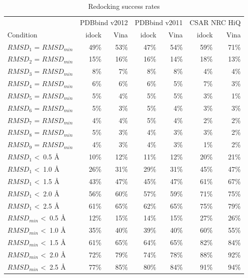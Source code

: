 \begin{table}
\caption{Redocking success rates}
\begin{tabular}{lrrrrrr}
\hline
& \multicolumn{2}{c}{PDBbind v2012} & \multicolumn{2}{c}{PDBbind v2011} & \multicolumn{2}{c}{CSAR NRC HiQ}\\
Condition & idock & Vina & idock & Vina & idock & Vina\\
\hline
$RMSD_1$ = $RMSD_{min}$ & 49\% & 53\% & 47\% & 54\% & 59\% & 71\%\\
$RMSD_2$ = $RMSD_{min}$ & 15\% & 16\% & 16\% & 14\% & 18\% & 13\%\\
$RMSD_3$ = $RMSD_{min}$ &  8\% &  7\% &  8\% &  8\% &  4\% &  4\%\\
$RMSD_4$ = $RMSD_{min}$ &  6\% &  6\% &  6\% &  5\% &  7\% &  3\%\\
$RMSD_5$ = $RMSD_{min}$ &  5\% &  4\% &  5\% &  5\% &  3\% &  1\%\\
$RMSD_6$ = $RMSD_{min}$ &  5\% &  3\% &  5\% &  4\% &  3\% &  3\%\\
$RMSD_7$ = $RMSD_{min}$ &  4\% &  4\% &  5\% &  4\% &  2\% &  2\%\\
$RMSD_8$ = $RMSD_{min}$ &  5\% &  3\% &  4\% &  3\% &  3\% &  2\%\\
$RMSD_9$ = $RMSD_{min}$ &  4\% &  3\% &  4\% &  3\% &  1\% &  2\%\\
\noalign{\smallskip}
$RMSD_1$ \textless\ 0.5 \AA & 10\% & 12\% & 11\% & 12\% & 20\% & 21\%\\
$RMSD_1$ \textless\ 1.0 \AA & 26\% & 31\% & 29\% & 31\% & 45\% & 47\%\\
$RMSD_1$ \textless\ 1.5 \AA & 43\% & 47\% & 45\% & 47\% & 61\% & 67\%\\
$RMSD_1$ \textless\ 2.0 \AA & 56\% & 60\% & 57\% & 59\% & 71\% & 75\%\\
$RMSD_1$ \textless\ 2.5 \AA & 61\% & 65\% & 62\% & 65\% & 75\% & 79\%\\
\noalign{\smallskip}
$RMSD_{min}$ \textless\ 0.5 \AA & 12\% & 15\% & 14\% & 15\% & 27\% & 26\%\\
$RMSD_{min}$ \textless\ 1.0 \AA & 35\% & 40\% & 39\% & 40\% & 60\% & 55\%\\
$RMSD_{min}$ \textless\ 1.5 \AA & 61\% & 65\% & 64\% & 65\% & 82\% & 84\%\\
$RMSD_{min}$ \textless\ 2.0 \AA & 72\% & 79\% & 74\% & 78\% & 88\% & 92\%\\
$RMSD_{min}$ \textless\ 2.5 \AA & 77\% & 85\% & 80\% & 84\% & 91\% & 94\%\\
\end{tabular}

\end{table}
